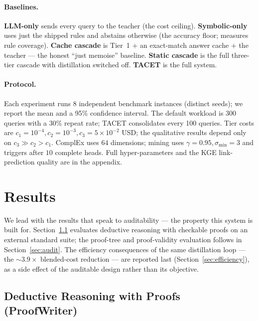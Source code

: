 \documentclass[11pt]{article}
\theoremstyle{plain}
\newcommand{\costFactor}{3.9}
\newcommand{\seeds}{8}
\begin{document}
\paragraph{Baselines.} \textbf{LLM-only} sends every query to the teacher
(the cost ceiling). \textbf{Symbolic-only} uses just the shipped rules and
abstains otherwise (the accuracy floor; measures rule coverage).
\textbf{Cache cascade} is Tier~1 $+$ an exact-match answer cache $+$ the
teacher --- the honest ``just memoise'' baseline. \textbf{Static cascade}
is the full three-tier cascade with distillation switched off. \textbf{TACET}
is the full system.

\paragraph{Protocol.} Each experiment runs \seeds{} independent benchmark
instances (distinct seeds); we report the mean and a 95\% confidence
interval. The default workload is 300 queries with a 30\% repeat rate;
TACET consolidates every 100 queries. Tier costs are
$c_1{=}10^{-4},c_2{=}10^{-3},c_3{=}5{\times}10^{-2}$ USD; the qualitative
results depend only on $c_3\!\gg\!c_2\!>\!c_1$. ComplEx uses $64$
dimensions; mining uses $\gamma{=}0.95,\sigma_{\mathrm{min}}{=}3$ and triggers after $10$
complete heads. Full hyper-parameters and the KGE link-prediction quality
are in the appendix.

\section{Results}
\label{sec:results}

We lead with the results that speak to auditability --- the property this
system is built for. Section~\ref{sec:proofwriter} evaluates deductive
reasoning with checkable proofs on an external standard suite; the proof-tree
and proof-validity evaluation follows in Section~\ref{sec:audit}. The
efficiency consequences of the same distillation loop ---
the ${\sim}\costFactor\times$ blended-cost reduction --- are reported last
(Section~\ref{sec:efficiency}), as a side effect of the auditable design
rather than its objective.

\subsection{Deductive Reasoning with Proofs (ProofWriter)}
\label{sec:proofwriter}
\end{document}
